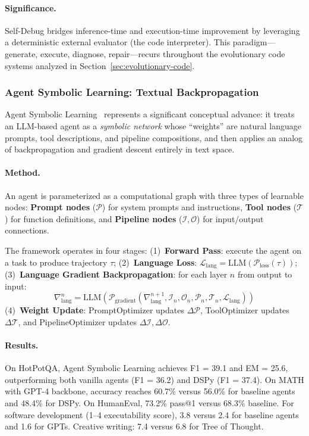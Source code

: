 \paragraph{Significance.}
Self-Debug bridges inference-time and execution-time improvement by leveraging a deterministic external evaluator (the code interpreter). This paradigm---generate, execute, diagnose, repair---recurs throughout the evolutionary code systems analyzed in Section~\ref{sec:evolutionary-code}.

\subsubsection{Agent Symbolic Learning: Textual Backpropagation}
\label{sec:symbolic-learning}

Agent Symbolic Learning~\citep{zhou2024symbolic} represents a significant conceptual advance: it treats an LLM-based agent as a \emph{symbolic network} whose ``weights'' are natural language prompts, tool descriptions, and pipeline compositions, and then applies an analog of backpropagation and gradient descent entirely in text space.

\paragraph{Method.}
An agent is parameterized as a computational graph with three types of learnable nodes: \textbf{Prompt nodes} ($\mathcal{P}$) for system prompts and instructions, \textbf{Tool nodes} ($\mathcal{T}$) for function definitions, and \textbf{Pipeline nodes} ($\mathcal{I}, \mathcal{O}$) for input/output connections.

The framework operates in four stages: (1)~\textbf{Forward Pass}: execute the agent on a task to produce trajectory $\tau$; (2)~\textbf{Language Loss}: $\mathcal{L}_{\text{lang}} = \text{LLM}(\mathcal{P}_{\text{loss}}(\tau))$; (3)~\textbf{Language Gradient Backpropagation}: for each layer $n$ from output to input:
\begin{equation}
    \nabla_{\text{lang}}^n = \text{LLM}(\mathcal{P}_{\text{gradient}}(\nabla_{\text{lang}}^{n+1}, \mathcal{I}_n, \mathcal{O}_n, \mathcal{P}_n, \mathcal{T}_n, \mathcal{L}_{\text{lang}}))
\end{equation}
(4)~\textbf{Weight Update}: PromptOptimizer updates $\Delta\mathcal{P}$, ToolOptimizer updates $\Delta\mathcal{T}$, and PipelineOptimizer updates $\Delta\mathcal{I}, \Delta\mathcal{O}$.

\paragraph{Results.}
On HotPotQA, Agent Symbolic Learning achieves F1 = 39.1 and EM = 25.6, outperforming both vanilla agents (F1 = 36.2) and DSPy (F1 = 37.4). On MATH with GPT-4 backbone, accuracy reaches 60.7\% versus 56.0\% for baseline agents and 48.4\% for DSPy. On HumanEval, 73.2\% pass@1 versus 68.3\% baseline. For software development (1--4 executability score), 3.8 versus 2.4 for baseline agents and 1.6 for GPTs. Creative writing: 7.4 versus 6.8 for Tree of Thought.

